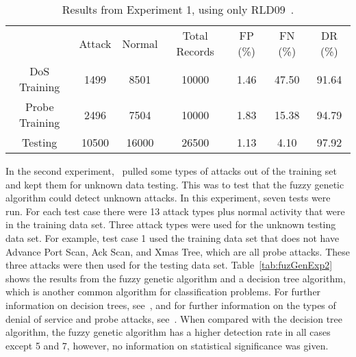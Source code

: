 \documentclass{sig-alternate}
\begin{document}
\begin{table*}
\center
\caption{Results from Experiment 1, using only RLD09~\cite{6496342}.}
\vspace{0.20cm}
\begin{tabular}{ccccccc}
 & Attack & Normal & Total Records & FP (\%) & FN (\%) & DR (\%)\\
DoS Training & 1499 & 8501 & 10000 & 1.46 & 47.50 & 91.64\\
Probe Training & 2496 & 7504 & 10000 & 1.83 & 15.38 & 94.79\\
Testing & 10500 & 16000 & 26500 & 1.13 & 4.10 & 97.92\\
\end{tabular}
\label{tab:fuzGenExp1}
\center
\end{table*}

In the second experiment,~\cite{6496342} pulled some types of attacks out of the training set and kept them for unknown data testing. This was to test that the fuzzy genetic algorithm could detect unknown attacks. In this experiment, seven tests were run. For each test case there were 13 attack types plus normal activity that were in the training data set. Three attack types were used for the unknown testing data set. For example, test case 1 used the training data set that does not have Advance Port Scan, Ack Scan, and Xmas Tree, which are all probe attacks. These three attacks were then used for the testing data set. Table~\ref{tab:fuzGenExp2} shows the results from the fuzzy genetic algorithm and a decision tree algorithm, which is another common algorithm for classification problems. For further information on decision trees, see~\cite{decisionTree}, and for further information on the types of denial of service and probe attacks, see~\cite{typesOfAttacks}. When compared with the decision tree algorithm, the fuzzy genetic algorithm has a higher detection rate in all cases except 5 and 7, however, no information on statistical significance was given.
\end{document}
